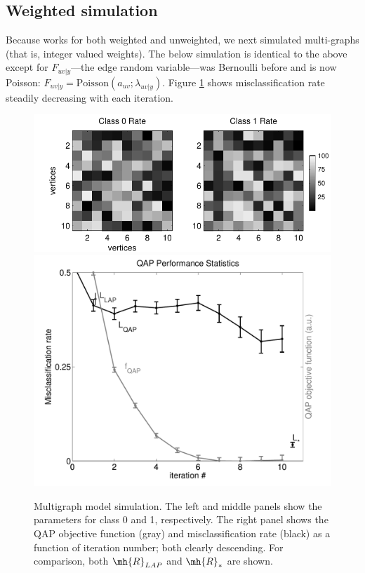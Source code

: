 \documentclass[10pt,journal,cspaper,compsoc]{IEEEtran}
\begin{document}


\subsection{Weighted simulation} %
\label{sub:heterogeneous_simulation}

Because \qapa works for both weighted and unweighted, we next simulated multi-graphs (that is, integer valued weights).  The below simulation is identical to the above except for $F_{uv|y}$---the edge random variable---was Bernoulli before and is now Poisson:  $F_{uv|y}=\text{Poisson}(a_{uv}; \lambda_{uv|y})$.  Figure \ref{fig:poiss} shows misclassification rate steadily decreasing with each iteration.

\begin{figure}[htbp]
	\centering			
	\includegraphics[width=1.0\linewidth]{../figs/poiss_model}
	\includegraphics[width=1.0\linewidth]{../figs/poiss_performance}
	\caption{Multigraph model simulation. The left and middle panels show the parameters for class 0 and  1, respectively.  The right panel shows the QAP objective function (gray) and misclassification rate (black) as a function of iteration number; both clearly descending.  For comparison, both $\mh{R}_{LAP}$ and $\mh{R}_*$ are shown.    }
	\label{fig:poiss}
\end{figure}
\end{document}
